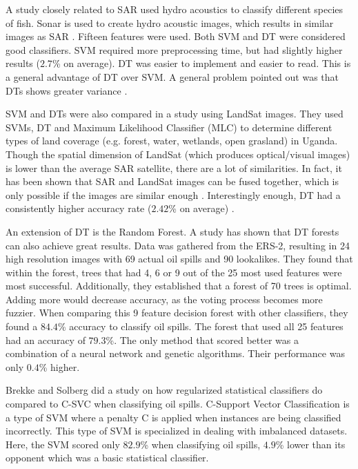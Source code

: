 A study closely related to SAR used hydro acoustics to classify different species of fish. Sonar is used to create hydro acoustic images, which results in similar images as SAR \cite{griffiths2003synthetic}. Fifteen features were used. Both SVM and DT were considered good classifiers. SVM required more preprocessing time, but had slightly higher results ($2.7$\% on average). DT was easier to implement and easier to read. This is a general advantage of DT over SVM. A general problem pointed out was that DTs shows greater variance \cite{Robotham2011170}.

SVM and DTs were also compared in a study using LandSat images. They used SVMs, DT and Maximum Likelihood Classifier (MLC) to determine different types of land coverage (e.g. forest, water, wetlands, open grasland) in Uganda. Though the spatial dimension of LandSat (which produces optical/visual images) is lower than the average SAR satellite, there are a lot of similarities. In fact, it has been shown that SAR and LandSat images can be fused together, which is only possible if the images are similar enough \cite{dupas2000sar}. Interestingly enough, DT had a consistently higher accuracy rate ($2.42$\% on average) \cite{Otukei2010S27}.

An extension of DT is the Random Forest. A study \cite{Topouzelis201268} has shown that DT forests can also achieve great results. Data was gathered from the ERS-2, resulting in 24 high resolution images with 69 actual oil spills and 90 lookalikes. They found that within the forest, trees that had 4, 6 or 9 out of the 25 most used features were most successful. Additionally, they established that a forest of 70 trees is optimal. Adding more would decrease accuracy, as the voting process becomes more fuzzier. When comparing this 9 feature decision forest with other classifiers, they found a $84.4$\% accuracy to classify oil spills. The forest that used all 25 features had an accuracy of $79.3$\%. The only method that scored better was a combination of a neural network and genetic algorithms. Their performance was only $0.4$\% higher.

Brekke and Solberg \cite{brekke2008classifiers} did a study on how regularized statistical classifiers do compared to C-SVC when classifying oil spills. C-Support Vector Classification is a type of SVM where a penalty C is applied when instances are being classified incorrectly. This type of SVM is specialized in dealing with imbalanced datasets. Here, the SVM scored only $82.9$\% when classifying oil spills, $4.9$\% lower than its opponent which was a basic statistical classifier. 

